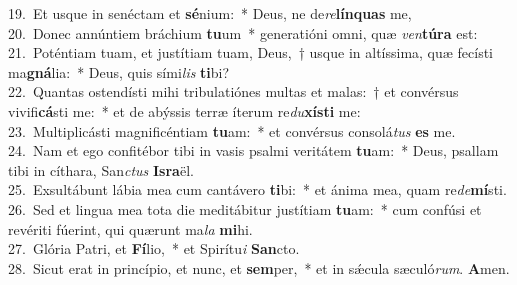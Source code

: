 {19.~}Et usque in senéctam et \textbf{sé}nium:~* Deus, ne de\textit{re}\textbf{lín}\textbf{quas} me,\\
{20.~}Donec annúntiem bráchium \textbf{tu}um~* generatióni omni, quæ \textit{ven}\textbf{tú}\textbf{ra} est:\\
{21.~}Poténtiam tuam, et justítiam tuam, Deus,~† usque in altíssima, quæ fecísti ma\textbf{gná}lia:~* Deus, quis sími\textit{lis} \textbf{ti}bi?\\
{22.~}Quantas ostendísti mihi tribulatiónes multas et malas:~† et convérsus vivifi\textbf{cá}sti me:~* et de abýssis terræ íterum re\textit{du}\textbf{xí}\textbf{sti} me:\\
{23.~}Multiplicásti magnificéntiam \textbf{tu}am:~* et convérsus consolá\textit{tus} \textbf{es} me.\\
{24.~}Nam et ego confitébor tibi in vasis psalmi veritátem \textbf{tu}am:~* Deus, psallam tibi in cíthara, San\textit{ctus} \textbf{Is}\textbf{ra}ël.\\
{25.~}Exsultábunt lábia mea cum cantávero \textbf{ti}bi:~* et ánima mea, quam re\textit{de}\textbf{mí}sti.\\
{26.~}Sed et lingua mea tota die meditábitur justítiam \textbf{tu}am:~* cum confúsi et revériti fúerint, qui quærunt ma\textit{la} \textbf{mi}hi.\\
{27.~}Glória Patri, et \textbf{Fí}lio,~* et Spirítu\textit{i} \textbf{San}cto.\\
{28.~}Sicut erat in princípio, et nunc, et \textbf{sem}per,~* et in sǽcula sæculó\textit{rum}. \textbf{A}men.\\
